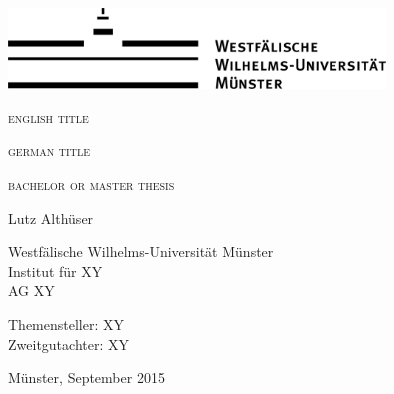 \begin{titlepage}
\thispagestyle{empty}
 \begin{center}
 \includegraphics[width=10cm]{res/WWU_Logo1_1c}
 \par
 \vspace*{10ex}
 \huge
 \textsc{english title}
 \par
 \vspace*{3ex}
 \textsc{german title}
 \par
 \normalsize
 \vspace*{25ex}
 \large
 \textsc{bachelor or master thesis}\\
 \par
 \large
 Lutz Althüser
 \par
 \normalsize
 \vspace*{1ex}
Westfälische Wilhelms-Universität Münster\\
Institut für XY \\
AG XY
\par
\vspace*{15ex}
Themensteller: XY \\ 
Zweitgutachter: XY
\par
\normalsize
\vspace*{2ex}
Münster, September 2015
\end{center}
\clearpage

\end{titlepage}
